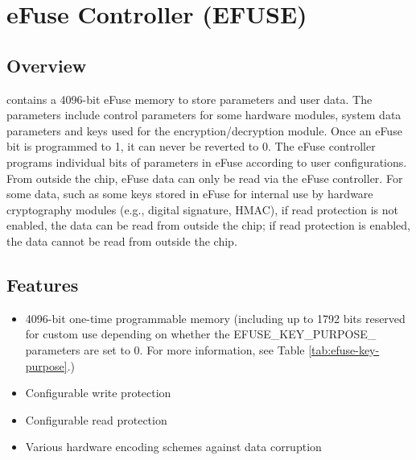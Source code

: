 \documentclass[main\_\_EN.tex]{subfiles}
\begin{document}

\ifglobal
\else
    {\let\clearpage\relax \listoftodos}
    {\let\clearpage\relax \listofdonetodos}
    \tableofcontents
\fi



\hypertarget{efuse}{}
\chapter{eFuse Controller (EFUSE)}
\label{mod:efuse}

\section{Overview}

\chipname{} contains a 4096-bit eFuse memory to store parameters and user data. The parameters include control parameters for some hardware modules, system data parameters and keys used for the encryption/decryption module. Once an eFuse bit is programmed to 1, it can never be reverted to 0. The eFuse controller programs individual bits of parameters in eFuse according to user configurations. From outside the chip, eFuse data can only be read via the eFuse controller. For some data, such as some keys stored in eFuse for internal use by hardware cryptography modules (e.g., digital signature, HMAC), if read protection is not enabled, the data can be read from outside the chip; if read protection is enabled, the data cannot be read from outside the chip.


\section{Features}

\begin{itemize}
    \item 4096-bit one-time programmable memory (including up to 1792 bits reserved for custom use depending on whether the EFUSE\_KEY\_PURPOSE\_ parameters are set to 0. For more information, see Table \ref{tab:efuse-key-purpose}.)
    \item Configurable write protection
    \item Configurable read protection
    \item Various hardware encoding schemes against data corruption
\end{itemize}
\end{document}
